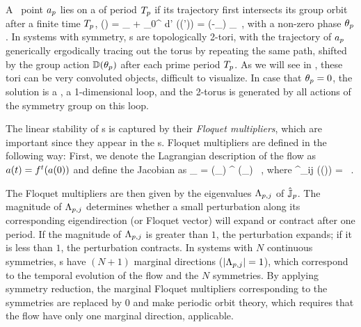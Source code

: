 A \statesp\ point $a_{p}$ lies on a \emph{\rpo} of period
${T_{p}}$ if its trajectory first intersects its group orbit after
a finite time ${T_{p}}$,
\beq
\ssp(\period{\rpprime})
    = \ssp_\rpprime
     + \int_0^\period{\rpprime} \!\!\!d\tau' \vel(\ssp (\tau'))
    = \matrixRep(-\theta_\rpprime) \ssp_\rpprime
  \,,
with a non-zero phase $\theta_{p}$. In systems with 
symmetry, \rpo s are topologically 2-tori, with the trajectory of
$a_{p}$ generically ergodically tracing out the torus by
repeating the same path, shifted by the group action
$\mathbb{D}(\theta_{p})$ after each prime period
${T_{p}}$. As we will see in , these tori
can be very convoluted objects, difficult to visualize. In case that
$\theta_{p}=0$, the solution is a \po, a 1-dimensional loop, and
the 2-torus is generated by all actions of the symmetry group on this
loop.

The linear stability of \rpo s is captured by their \emph{Floquet multipliers},
which are important since they appear in the \cycForm s. Floquet multipliers are
defined in the following way: First, we denote the Lagrangian description of the flow as
$a(t) = {f^{t}(a(0))}$ and define the Jacobian as
\beq
\jMpsRed_{\rpprime}
= \matrixRep(\theta_\rpprime ) \jMps^\period{\rpprime} (\ssp_\rpprime)
\, , \mbox{where}\quad
\jMps^{\zeit}_{ij} (\ssp(\zeit)) = \, .

The Floquet multipliers are then given by the eigenvalues $\Lambda_{p,j}$ of $\hat{\mathbb{J}}_{p}$.
The magnitude of $\Lambda_{p,j}$ determines whether a small perturbation along its corresponding
eigendirection (or Floquet vector) will expand or contract after one period. If the magnitude of
$\Lambda_{p,j}$ is greater than $1$, the perturbation expands; if it is less than $1$, the perturbation
contracts. In systems with $N$ continuous symmetries, \rpo s  have $(N+1)$ marginal directions ($\left|\Lambda_{p,j}\right| = 1$),
which correspond to the temporal evolution of the flow and the $N$ symmetries. By applying symmetry reduction,
the marginal Floquet multipliers corresponding to the symmetries are replaced by $0$ and make periodic orbit
theory, which requires that the flow have only one marginal direction, applicable.

